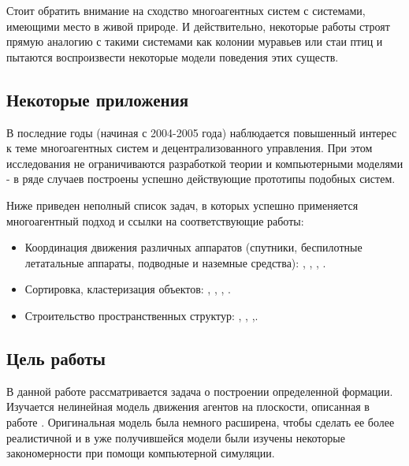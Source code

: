 Стоит обратить внимание на сходство многоагентных систем с системами, имеющими место в живой природе. И действительно, некоторые работы строят прямую аналогию с  такими системами как колонии муравьев или стаи птиц и пытаются воспроизвести некоторые модели поведения этих существ.

\subsection*{Некоторые приложения}

В последние годы (начиная с 2004-2005 года) наблюдается
повышенный интерес к теме многоагентных систем и
децентрализованного управления. При этом исследования
не ограничиваются разработкой теории и компьютерными
моделями - в ряде случаев построены успешно
действующие прототипы подобных систем. 

Ниже приведен неполный список задач, в которых успешно  применяется многоагентный подход и ссылки на соответствующие работы:
\begin{itemize}
\item Координация движения различных аппаратов (спутники, беспилотные летатальные аппараты, подводные и наземные средства): \cite{lafferriere2005decentralized}, \cite{veerman2005flocks}, \cite{vasarhelyi2014outdoor}, \cite{williams2005stable}.
\item Сортировка, кластеризация объектов: \cite{deneubourg1991dynamics}, \cite{ding2014sorting}, \cite{kabla2012collective}, \cite{santos2014segregation}.
\item Строительство пространственных структур: \cite{pennisi2014cooperative}, \cite{petersen2014collective}, \cite{augugliaro2013building},\cite{lindsey2011construction}.
\end{itemize}

\subsection*{Цель работы}

В данной работе рассматривается задача о построении  определенной формации. Изучается нелинейная модель движения агентов на плоскости, описанная в работе \cite{veerman2005flocks}. Оригинальная модель была немного расширена, чтобы сделать ее более реалистичной и в уже получившейся модели были изучены некоторые закономерности при помощи компьютерной симуляции.

\clearpage